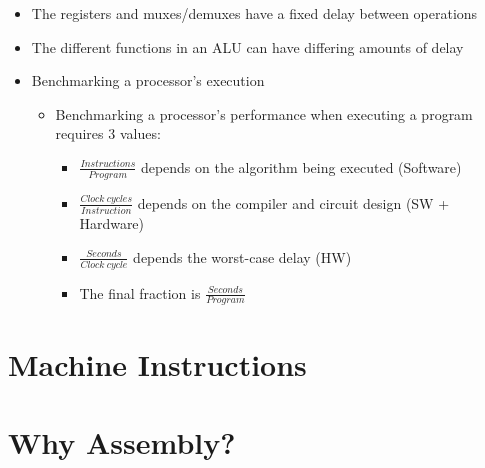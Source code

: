 \documentclass{article}
\begin{document}
\begin{itemize}
\begin{itemize}
			\item The registers and muxes/demuxes have a fixed delay between operations
			\item The different functions in an ALU can have differing amounts of delay
			\item Benchmarking a processor's execution
				\begin{itemize}
					\item Benchmarking a processor's performance when executing a program requires 3 values:
						\begin{itemize}
							\item $\displaystyle\frac{Instructions}{Program}$ depends on the algorithm being executed (Software)
							\item $\displaystyle\frac{Clock ~ cycles}{Instruction}$ depends on the compiler and circuit design (SW + Hardware)
							\item $\displaystyle\frac{Seconds}{Clock ~ cycle}$ depends the worst-case delay (HW)
							\item The final fraction is $\displaystyle\frac{Seconds}{Program}$
						\end{itemize}
				\end{itemize}
		\end{itemize}
\end{itemize}

\section{Machine Instructions}

\section{Why Assembly?}
\end{document}
